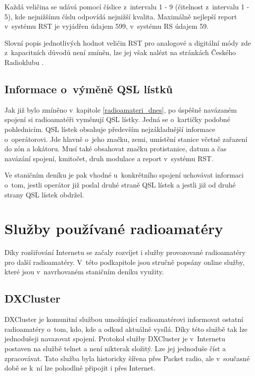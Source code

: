 Každá veličina se udává pomocí číslice z~intervalu 1 - 9 (čitelnost z~intervalu 1 - 5), kde nejnižšímu číslu odpovídá nejnižší kvalita.
Maximálně nejlepší report v~systému RST je vyjádřen údajem 599, v~systému RS údajem 59.

Slovní popis jednotlivých hodnot veličin RST pro analogové a digitální módy zde z~kapacitních důvodů není zmíněn, lze jej však
nalézt na stránkách Českého Radioklubu \cite{crk_rst}.

\subsection{Informace o~výměně QSL lístků}

Jak již bylo zmíněno v~kapitole \ref{radioamateri_dnes}, po úspěšně navázaném spojení si radioamatéři vyměnují QSL lístky.
Jedná se o~kartičky podobné pohlednicím. QSL lístek obsahuje především nejzákladnější informace o~operátorovi.
Jde hlavně o~jeho značku, zemi, umístění stanice včetně zařazení do zón a lokátoru.
Musí také obsahovat značku protistanice, datum a čas navázání spojení, kmitočet, druh modulace a report v~systému RST. 

Ve staničním deníku je pak vhodné u~konkrétního spojení uchovávat informaci o~tom, jestli operátor již poslal druhé
straně QSL lístek a jestli již od druhé strany QSL lístek obdržel.


\section{Služby používané radioamatéry}
\label{radioamateri_sluzby}

Díky rozšiřování Internetu se začaly rozvíjet i služby provozované radioamatéry pro další radioamatéry. V~této podkapitole
jsou stručně popsány online služby, které jsou v~navrhovaném staničním deníku využity.

\subsection{DXCluster}

DXCluster je komunitní službou umožňující radioamatérovi informovat ostatní
radioamatéry o~tom, kdo, kde a odkud aktuálně vysílá. Díky této službě tak lze jednodušeji navazovat
spojení. Protokol služby DXCluster je v~Internetu postaven na službě telnet a není nikterak
složitý. Lze jej jednoduše číst a zpracovávat. Tato služba byla historicky
šířena přes Packet radio, ale v~současné době se k~ní lze pohodlně připojit i přes
Internet.

